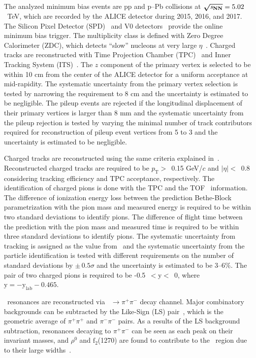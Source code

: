 \documentclass[ALICE,manyauthors]{cernphprep}
\begin{document}
The analyzed minimum bias events are pp and p--Pb collisions at $\boldsymbol{\sqrt{{\textit s_{\mathrm{NN}}}}}=5.02$~TeV, which are recorded by the ALICE detector during 2015, 2016, and 2017. The Silicon Pixel Detector (SPD)~\cite{Cali:2008zz} and V0 detectors~\cite{ALICE:2013axi} provide the online minimum bias trigger. The multiplicity class is defined with Zero Degree Calorimeter (ZDC), which detects ``slow'' nucleons at very large $\eta$~\cite{Cortese:2019nnv}. Charged tracks are reconstructed with Time Projection Chamber (TPC)~\cite{Alme:2010ke} and Inner Tracking System (ITS)~\cite{ALICE:2010tia}. The $z$ component of the primary vertex is selected to be within 10 cm from the center of the ALICE detector for a uniform acceptance at mid-rapidity. The systematic uncertainty from the primary vertex selection is tested by narrowing the requirement to 8 cm and the uncertainty is estimated to be negligible. The pileup events are rejected if the longitudinal displacement of their primary vertices is larger than 8 mm and the systematic uncertainty from the pileup rejection is tested by varying the minimal number of track contributors required for reconstruction of pileup event vertices from 5 to 3 and the uncertainty is estimated to be negligible.

Charged tracks are reconstructed using the same criteria explained in~\cite{ALICE:2013wgn}. Reconstructed charged tracks are required to be $p_{\mathrm{T}}>$~0.15 GeV/$c$ and $|\eta|<$~0.8 considering tracking efficiency and TPC acceptance, respectively. The identification of charged pions is done with the TPC and the TOF~\cite{Jacazio:2018slq} information. The difference of ionization energy loss between the prediction Bethe-Block parametrization with the pion mass and measured energy is required to be within two standard deviations to identify pions. The difference of flight time between the prediction with the pion mass and measured time is required to be within three standard deviations to identify pions. The systematic uncertainty from tracking is assigned as the value from~\cite{ALICE:2013wgn} and the systematic uncertainty from the particle identification is tested with different requirements on the number of standard deviations by $\pm\,0.5\sigma$ and the uncertainty is estimated to be 3--6\%. The pair of two charged pions is required to be -0.5~$<\mathrm{y}<$~0, where $\mathrm{y} = -\mathrm{y}_{\mathrm{lab}} -0.465$.

\fzero~resonances are reconstructed via \fzero~$\rightarrow \pi^{+}\pi^{-}$ decay channel. Major combinatory backgrounds can be subtracted by the Like-Sign (LS) pair~\cite{PhysRevD.36.2019}, which is the geometric average of $\pi^{+}\pi^{+}$ and $\pi^{-}\pi^{-}$ pairs. As a results of the LS background subtraction, resonances decaying to $\pi^{+}\pi^{-}$ can be seen as each peak on their invariant masses, and $\rho^{0}$ and $\mathrm{f}_{2}$(1270) are found to contribute to the \fzero~region due to their large widths~\cite{ParticleDataGroup:2020ssz}.
\end{document}
